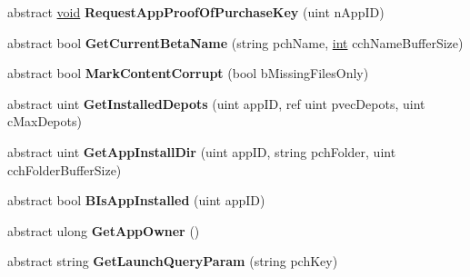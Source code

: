 \begin{DoxyCompactItemize}
\item 
\hypertarget{classValve_1_1Steamworks_1_1ISteamApps_ab4cc69cc377927e9908586bace00619b}{}abstract \hyperlink{SDL__audio_8h_a52835ae37c4bb905b903cbaf5d04b05f}{void} {\bfseries Request\+App\+Proof\+Of\+Purchase\+Key} (uint n\+App\+I\+D)\label{classValve_1_1Steamworks_1_1ISteamApps_ab4cc69cc377927e9908586bace00619b}

\item 
\hypertarget{classValve_1_1Steamworks_1_1ISteamApps_a24ee7b2dc681f3706d5228066a6140df}{}abstract bool {\bfseries Get\+Current\+Beta\+Name} (string pch\+Name, \hyperlink{SDL__thread_8h_a6a64f9be4433e4de6e2f2f548cf3c08e}{int} cch\+Name\+Buffer\+Size)\label{classValve_1_1Steamworks_1_1ISteamApps_a24ee7b2dc681f3706d5228066a6140df}

\item 
\hypertarget{classValve_1_1Steamworks_1_1ISteamApps_ad01716209399450a37f52b3db03e8fc0}{}abstract bool {\bfseries Mark\+Content\+Corrupt} (bool b\+Missing\+Files\+Only)\label{classValve_1_1Steamworks_1_1ISteamApps_ad01716209399450a37f52b3db03e8fc0}

\item 
\hypertarget{classValve_1_1Steamworks_1_1ISteamApps_a83c93fe07db04f0e56b86e91c1366a23}{}abstract uint {\bfseries Get\+Installed\+Depots} (uint app\+I\+D, ref uint pvec\+Depots, uint c\+Max\+Depots)\label{classValve_1_1Steamworks_1_1ISteamApps_a83c93fe07db04f0e56b86e91c1366a23}

\item 
\hypertarget{classValve_1_1Steamworks_1_1ISteamApps_aa57cfb5a8f19dada66cde96db63db625}{}abstract uint {\bfseries Get\+App\+Install\+Dir} (uint app\+I\+D, string pch\+Folder, uint cch\+Folder\+Buffer\+Size)\label{classValve_1_1Steamworks_1_1ISteamApps_aa57cfb5a8f19dada66cde96db63db625}

\item 
\hypertarget{classValve_1_1Steamworks_1_1ISteamApps_ac8d7a107007a69f3a295d9001c590473}{}abstract bool {\bfseries B\+Is\+App\+Installed} (uint app\+I\+D)\label{classValve_1_1Steamworks_1_1ISteamApps_ac8d7a107007a69f3a295d9001c590473}

\item 
\hypertarget{classValve_1_1Steamworks_1_1ISteamApps_a4a2f5c9fba081170757ed6e9a9d08bc7}{}abstract ulong {\bfseries Get\+App\+Owner} ()\label{classValve_1_1Steamworks_1_1ISteamApps_a4a2f5c9fba081170757ed6e9a9d08bc7}

\item 
\hypertarget{classValve_1_1Steamworks_1_1ISteamApps_a0b6a32da2410f10420b9c5341473026f}{}abstract string {\bfseries Get\+Launch\+Query\+Param} (string pch\+Key)\label{classValve_1_1Steamworks_1_1ISteamApps_a0b6a32da2410f10420b9c5341473026f}


\end{DoxyCompactItemize}
